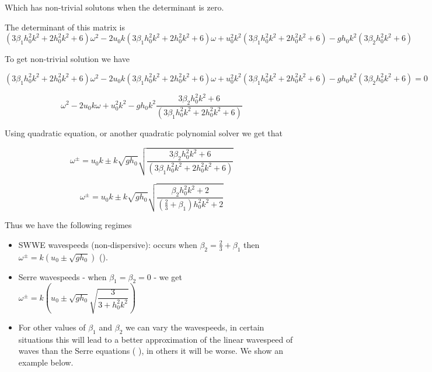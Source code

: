 \documentclass[10pt]{article}
\begin{document}
Which has non-trivial solutons when the determinant is zero. 

The determinant of this matrix is
\begin{equation}
\left(3\beta_1 h_0^2 k^2 + 2h_0^2 k^2 + 6\right)\omega^2 - 2 u_0k \left(3\beta_1 h_0^2 k^2 + 2h_0^2 k^2 + 6\right)\omega  + u_0^2 k^2 \left(3\beta_1 h_0^2 k^2 + 2h_0^2 k^2 + 6\right) - g h_0 k^2 \left(3 \beta_2 h_0^2 k^2 + 6\right)
\end{equation} 

To get non-trivial solution we have

\begin{equation}
\left(3\beta_1 h_0^2 k^2 + 2h_0^2 k^2 + 6\right)\omega^2 - 2 u_0k \left(3\beta_1 h_0^2 k^2 + 2h_0^2 k^2 + 6\right)\omega  + u_0^2 k^2 \left(3\beta_1 h_0^2 k^2 + 2h_0^2 k^2 + 6\right) - g h_0 k^2 \left(3 \beta_2 h_0^2 k^2 + 6\right) = 0
\end{equation} 

\begin{equation}
\omega^2 - 2 u_0k \omega  + u_0^2 k^2 - g h_0 k^2 \dfrac{3 \beta_2 h_0^2 k^2 + 6}{\left(3\beta_1 h_0^2 k^2 + 2h_0^2 k^2 + 6\right)} 
\end{equation} 

Using quadratic equation, or another quadratic polynomial solver we get that

\begin{equation}
\omega^\pm = u_0 k \pm k \sqrt{gh_0} \sqrt{\dfrac{3 \beta_2 h_0^2 k^2 + 6}{\left(3\beta_1 h_0^2 k^2 + 2h_0^2 k^2 + 6\right)} }
\end{equation}

\begin{equation}
\omega^\pm = u_0 k \pm k \sqrt{gh_0} \sqrt{\dfrac{\beta_2 h_0^2 k^2 + 2}{\left(\frac{2}{3} + \beta_1\right) h_0^2 k^2 + 2} }
\end{equation}


Thus we have the following regimes
\begin{itemize}
	\item SWWE wavespeeds (non-dispersive): occurs when $\beta_2 = \frac{2}{3} + \beta_1$ then $\omega^\pm = k\left(u_0\pm \sqrt{gh_0}\right)$ (\cite{Clamond-Dutykh-2018-237}).
	\item Serre wavespeeds - when $\beta_1 = \beta_2 = 0$ - we get $\omega^\pm = k\left(u_0\pm \sqrt{gh_0} \sqrt{\dfrac{3}{3 + h_0^2 k^2}}\right)$
	\item For other values of $\beta_1$ and $\beta_2$ we can vary the wavespeeds, in certain situations this will lead to a better approximation of the linear wavespeed of waves than the Serre equations ( \cite{Clamond-Dutykh-2018-237}), in others it will be worse. We show an example below.
\end{itemize}
\end{document}
